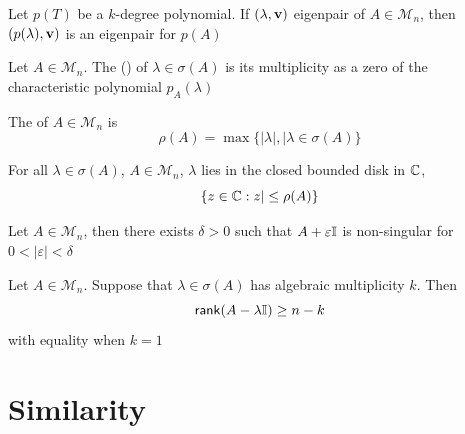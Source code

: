 \documentclass[aspectratio=169]{beamer}
\begin{document}
\begin{frame}
\begin{theorem}
Let $p(T)$ be a $k$-degree polynomial. If $(\lambda,\mathbf{v})$ eigenpair of $A\in \mathcal{M}_n$, then $(p(\lambda),\mathbf{v})$ is an eigenpair for $p(A)$
\end{theorem}
\vfill
\begin{definition}
Let $A\in \mathcal{M}_{n}$. The ()  of $\lambda\in \sigma(A)$ is its multiplicity as a zero of the characteristic polynomial $p_A(\lambda)$
\end{definition}    
\end{frame}

\begin{frame}
\begin{definition}
The  of $A\in \mathcal{M}_n$ is 
\[
  \rho(A)= \max \{ | \lambda |, \mid \lambda\in \sigma(A)\}
\]
\end{definition}
\vfill
\begin{proposition}
For all $\lambda\in \sigma(A)$, $A\in \mathcal{M}_n$, $\lambda$ lies in the closed bounded disk in $\mathbb{C}$, 
\[
  \{ z\in \mathbb{C}: z| \leq \rho(A)\}
\]
\end{proposition}
\vfill
\begin{theorem}
Let $A\in \mathcal{M}_n$, then there exists $\delta>0$ such that $A+\varepsilon\mathbb{I}$ is non-singular for $0< | \varepsilon | <\delta$
\end{theorem}
\end{frame}

\begin{frame}
\begin{theorem}
Let $A\in \mathcal{M}_{n}$. 
Suppose that $\lambda\in \sigma(A)$ has algebraic multiplicity $k$. 
Then 
\[
  \mathsf{rank} (A-\lambda\mathbb{I})\geq n-k
\]
with equality when $k=1$
\end{theorem}
\end{frame}

\section{Similarity}
\end{document}
